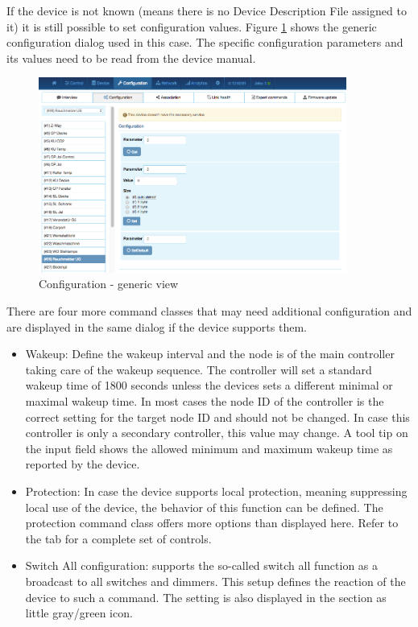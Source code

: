 If the device is not known (means there is no Device Description File assigned to it) it 
is still possible to set configuration values. Figure \ref{eui33} shows the generic 
configuration dialog used in this case. The specific configuration parameters and 
its values need to be read from the device manual.

\begin{figure}
\begin{center}
\includegraphics[width=0.9\textwidth]{pngs/cap7/eui33.png}
\caption{Configuration - generic view}
\label{eui33}
\end{center}
\end{figure}

There are four more command classes that may need additional configuration and are 
displayed in the same dialog if the device supports them.

\begin{itemize}
\item Wakeup: Define the wakeup interval and the node is of the main controller taking 
care of the wakeup sequence. The controller will set a standard wakeup time of 1800 
seconds unless the devices sets a different minimal or maximal wakeup time. In most 
cases the node ID of the controller is the correct setting for the target node ID and 
should not be changed. In case this controller is only a secondary controller, this 
value may change. A tool tip on the input field shows the allowed minimum and maximum 
wakeup time as reported by the device.
\item Protection: In case the device supports local protection, meaning suppressing 
local use of the device, the behavior of this function can be defined. The protection 
command class offers more options than displayed here. Refer to the  
tab for a complete set of controls.
\item Switch All configuration: \zwave supports the so-called switch all function as 
a broadcast to all switches and dimmers. This setup defines the reaction of the device 
to such a  command. The setting is also displayed in the  
section as little gray/green icon.
\end{itemize}

